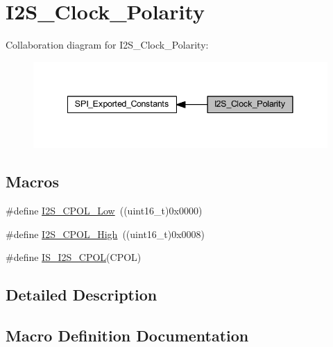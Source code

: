 \hypertarget{group___i2_s___clock___polarity}{}\section{I2\+S\+\_\+\+Clock\+\_\+\+Polarity}
\label{group___i2_s___clock___polarity}
Collaboration diagram for I2\+S\+\_\+\+Clock\+\_\+\+Polarity\+:
\nopagebreak
\begin{figure}[H]
\begin{center}
\leavevmode
\includegraphics[width=341pt]{group___i2_s___clock___polarity}
\end{center}
\end{figure}
\subsection*{Macros}
\begin{DoxyCompactItemize}
\item 
\#define \hyperlink{group___i2_s___clock___polarity_gae859a63575e4af3e007fc5123fa901ab}{I2\+S\+\_\+\+C\+P\+O\+L\+\_\+\+Low}~((uint16\+\_\+t)0x0000)
\item 
\#define \hyperlink{group___i2_s___clock___polarity_gae26f7f9fbde299fbdc0b81a2cc38bfdb}{I2\+S\+\_\+\+C\+P\+O\+L\+\_\+\+High}~((uint16\+\_\+t)0x0008)
\item 
\#define \hyperlink{group___i2_s___clock___polarity_ga6323375bf0b6fa6e2ee2a9ce6f9ef82f}{I\+S\+\_\+\+I2\+S\+\_\+\+C\+P\+OL}(C\+P\+OL)
\end{DoxyCompactItemize}


\subsection{Detailed Description}


\subsection{Macro Definition Documentation}
\mbox{\label{group___i2_s___clock___polarity_gae26f7f9fbde299fbdc0b81a2cc38bfdb}} 

